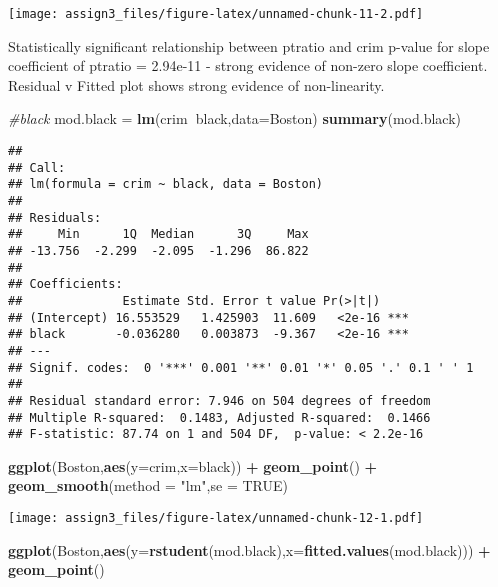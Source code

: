 \documentclass[]{article}
\newenvironment{Shaded}{\begin{snugshade}}{\end{snugshade}}
\newcommand{\CommentTok}[1]{\textcolor[rgb]{0.56,0.35,0.01}{\textit{#1}}}
\newcommand{\DataTypeTok}[1]{\textcolor[rgb]{0.13,0.29,0.53}{#1}}
\newcommand{\KeywordTok}[1]{\textcolor[rgb]{0.13,0.29,0.53}{\textbf{#1}}}
\newcommand{\NormalTok}[1]{#1}
\newcommand{\OperatorTok}[1]{\textcolor[rgb]{0.81,0.36,0.00}{\textbf{#1}}}
\newcommand{\OtherTok}[1]{\textcolor[rgb]{0.56,0.35,0.01}{#1}}
\newcommand{\StringTok}[1]{\textcolor[rgb]{0.31,0.60,0.02}{#1}}
\begin{document}
\texttt{[image: assign3\_files/figure-latex/unnamed-chunk-11-2.pdf]}

Statistically significant relationship between ptratio and crim p-value
for slope coefficient of ptratio = 2.94e-11 - strong evidence of
non-zero slope coefficient. Residual v Fitted plot shows strong evidence
of non-linearity.

\begin{Shaded}
\begin{Highlighting}[]
\CommentTok{#black}
\NormalTok{mod.black =}\StringTok{ }\KeywordTok{lm}\NormalTok{(crim}\OperatorTok{~}\NormalTok{black,}\DataTypeTok{data=}\NormalTok{Boston)}
\KeywordTok{summary}\NormalTok{(mod.black)}
\end{Highlighting}
\end{Shaded}

\begin{verbatim}
## 
## Call:
## lm(formula = crim ~ black, data = Boston)
## 
## Residuals:
##     Min      1Q  Median      3Q     Max 
## -13.756  -2.299  -2.095  -1.296  86.822 
## 
## Coefficients:
##              Estimate Std. Error t value Pr(>|t|)    
## (Intercept) 16.553529   1.425903  11.609   <2e-16 ***
## black       -0.036280   0.003873  -9.367   <2e-16 ***
## ---
## Signif. codes:  0 '***' 0.001 '**' 0.01 '*' 0.05 '.' 0.1 ' ' 1
## 
## Residual standard error: 7.946 on 504 degrees of freedom
## Multiple R-squared:  0.1483, Adjusted R-squared:  0.1466 
## F-statistic: 87.74 on 1 and 504 DF,  p-value: < 2.2e-16
\end{verbatim}

\begin{Shaded}
\begin{Highlighting}[]
\KeywordTok{ggplot}\NormalTok{(Boston,}\KeywordTok{aes}\NormalTok{(}\DataTypeTok{y=}\NormalTok{crim,}\DataTypeTok{x=}\NormalTok{black)) }\OperatorTok{+}\StringTok{ }\KeywordTok{geom_point}\NormalTok{() }\OperatorTok{+}\StringTok{ }\KeywordTok{geom_smooth}\NormalTok{(}\DataTypeTok{method =} \StringTok{"lm"}\NormalTok{,}\DataTypeTok{se =} \OtherTok{TRUE}\NormalTok{)}
\end{Highlighting}
\end{Shaded}

\texttt{[image: assign3\_files/figure-latex/unnamed-chunk-12-1.pdf]}

\begin{Shaded}
\begin{Highlighting}[]
\KeywordTok{ggplot}\NormalTok{(Boston,}\KeywordTok{aes}\NormalTok{(}\DataTypeTok{y=}\KeywordTok{rstudent}\NormalTok{(mod.black),}\DataTypeTok{x=}\KeywordTok{fitted.values}\NormalTok{(mod.black))) }\OperatorTok{+}\StringTok{ }\KeywordTok{geom_point}\NormalTok{() }
\end{Highlighting}
\end{Shaded}
\end{document}
